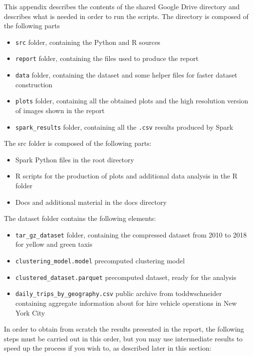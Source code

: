 \documentclass{acm_proc_article-sp-sigmod09}
\begin{document}
This appendix describes the contents of the shared Google Drive directory and describes what is needed in order to run the scripts. The directory is composed of the following parts

\begin{itemize}
	\item \texttt{src} folder, containing the Python and R sources
	\item \texttt{report} folder, containing the files used to produce the report
	\item \texttt{data} folder, containing the dataset and some helper files for faster dataset construction
	\item \texttt{plots} folder, containing all the obtained plots and the high resolution version of images shown in the report
	\item \texttt{spark\_results} folder, containing all the \texttt{.csv} results produced by Spark
\end{itemize}

The src folder is composed of the following parts:

\begin{itemize}
	\item Spark Python files in the root directory
	\item R scripts for the production of plots and additional data analysis in the R folder
	\item Docs and additional material in the docs directory
\end{itemize}

The dataset folder contains the following elements:

\begin{itemize}
	\item \texttt{tar\_gz\_dataset} folder, containing the compressed dataset from 2010 to 2018 for yellow and green taxis 
	\item \texttt{clustering\_model.model} precomputed clustering model
	\item \texttt{clustered\_dataset.parquet} precomputed dataset, ready for the analysis
	\item \texttt{daily\_trips\_by\_geography.csv} public archive from toddwschneider containing aggregate information about for hire vehicle operations in New York City
\end{itemize}

In order to obtain from scratch the results presented in the report, the following steps must be carried out in this order, but you may use intermediate results to speed up the process if you wish to, as described later in this section:
\end{document}
